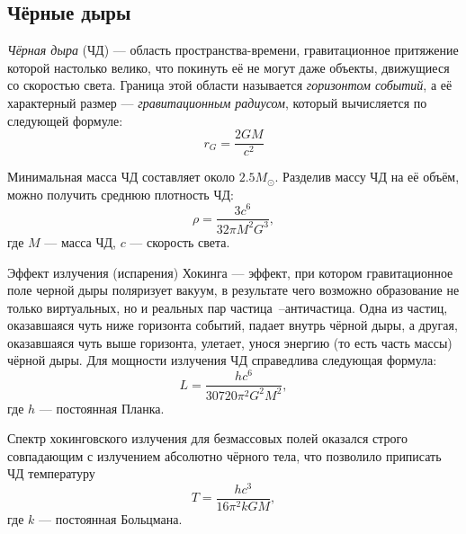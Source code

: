 \subsection{Чёрные дыры}
\textit{Чёрная дыра} (ЧД) --- область пространства-времени, гравитационное притяжение которой настолько велико, что покинуть её не могут даже объекты, движущиеся со скоростью света. Граница этой области называется \textit{горизонтом событий}, а её характерный размер --- \textit{гравитационным радиусом}, который вычисляется по следующей формуле:
\begin{equation}
r_G=\frac{2GM}{c^2}
\end{equation}

Минимальная масса ЧД составляет около $2.5M_{\odot}$. Разделив массу ЧД на её объём, можно получить среднюю плотность ЧД:
\begin{equation}
\rho=\frac{3c^6}{32\pi M^2G^3},
\end{equation}
где $M$ --- масса ЧД, $c$ --- скорость света.

Эффект излучения (испарения) Хокинга --- эффект, при котором гравитационное поле черной дыры поляризует вакуум, в результате чего возможно образование не только виртуальных, но и реальных пар частица~--античастица. Одна из частиц, оказавшаяся чуть ниже горизонта событий, падает внутрь чёрной дыры, а другая, оказавшаяся чуть выше горизонта, улетает, унося энергию (то есть часть массы) чёрной дыры. Для мощности излучения ЧД справедлива следующая формула:
\begin{equation}
L=\frac{hc^6}{30720\pi^2G^2M^2},
\end{equation}
где $h$ --- постоянная Планка.

Спектр хокинговского излучения для безмассовых полей оказался строго совпадающим с излучением абсолютно чёрного тела, что позволило приписать ЧД температуру
\begin{equation}
T=\frac{hc^3}{16\pi^2kGM},
\end{equation}
где $k$ --- постоянная Больцмана.